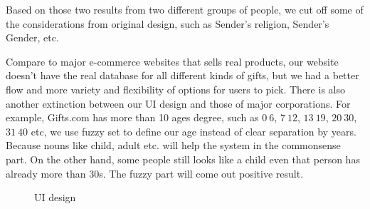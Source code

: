\documentclass[11pt,twocolumn]{article}
\begin{document}
Based on those two results from two different groups of people, we cut off some of the considerations from original design, such as Sender's religion, Sender's Gender, etc.




Compare to major e-commerce websites that sells real products, our website doesn't have the real database for all different kinds of gifts, but we had a better flow and more variety and flexibility of options for users to pick. There is also another extinction between our UI design and those of major corporations. For example, Gifts.com has more than 10 ages degree, such as $0~6$, $7~12$, $13~19$, $20~30$, $31~40$ etc, we use fuzzy set to define our age instead of clear separation by years. Because nouns like child, adult etc. will help the system in the commonsense part.  On the other hand, some people still looks like a child even that person has already more than 30s.  The fuzzy part will come out positive result.

\begin{figure}[h!t]
\caption{UI design}
\label{ui}
\end{figure}
\end{document}
